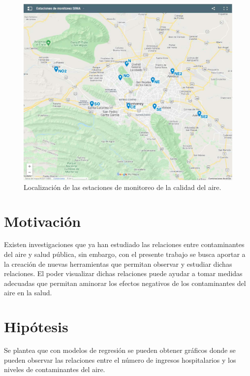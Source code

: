 \begin{figure}[h!]
\setcounter{figure}{0} %
\captionsetup{type=figure} %
\begin{center}
   \includegraphics[trim=50 50 50 50,clip,width=1\textwidth]{mapa_estaciones.eps}
   \end{center}
    \caption{Localización de las estaciones de monitoreo de la calidad del aire.}
    \label{estaciones}
\end{figure}

\clearpage

\section{Motivación}
Existen investigaciones que ya han estudiado las relaciones entre contaminantes del aire y salud pública, sin embargo, con el presente trabajo se busca aportar a la creación de nuevas herramientas que permitan observar y estudiar dichas relaciones. El poder visualizar dichas relaciones puede ayudar a tomar medidas adecuadas que permitan aminorar los efectos negativos de los contaminantes del aire en la salud.

\section{Hipótesis}
Se plantea que con modelos de regresión se pueden obtener gráficos donde se pueden observar las relaciones entre el número de ingresos hospitalarios y los niveles de contaminantes del aire.

